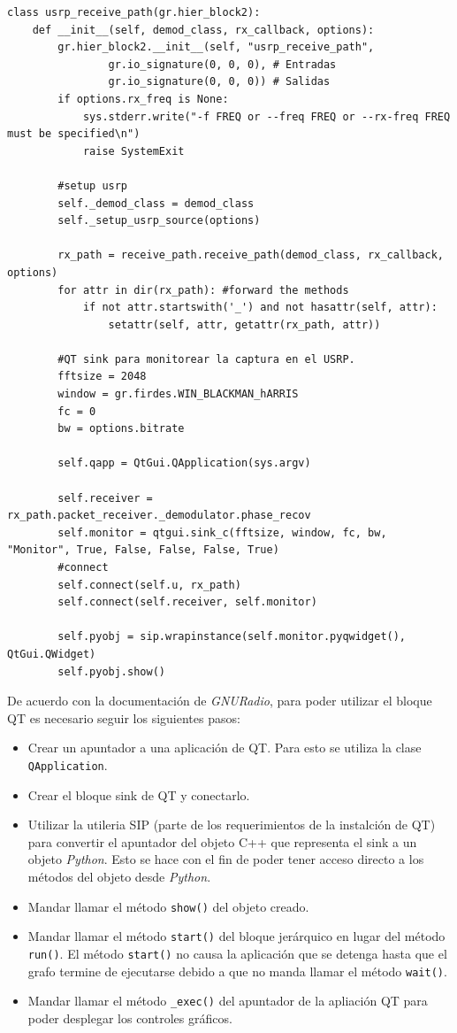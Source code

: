 \begin{lstlisting}[float, label=ex:qtsink, caption={Modificaci\'on del programa \emph{benchmark} para
desplegar el bloque gr\'afico de QT.}, breaklines=true] 
class usrp_receive_path(gr.hier_block2):
    def __init__(self, demod_class, rx_callback, options):
        gr.hier_block2.__init__(self, "usrp_receive_path",
                gr.io_signature(0, 0, 0), # Entradas
                gr.io_signature(0, 0, 0)) # Salidas
        if options.rx_freq is None:
            sys.stderr.write("-f FREQ or --freq FREQ or --rx-freq FREQ must be specified\n")
            raise SystemExit

        #setup usrp
        self._demod_class = demod_class
        self._setup_usrp_source(options)

        rx_path = receive_path.receive_path(demod_class, rx_callback, options)
        for attr in dir(rx_path): #forward the methods
            if not attr.startswith('_') and not hasattr(self, attr):
                setattr(self, attr, getattr(rx_path, attr))

        #QT sink para monitorear la captura en el USRP.
        fftsize = 2048
        window = gr.firdes.WIN_BLACKMAN_hARRIS
        fc = 0
        bw = options.bitrate

        self.qapp = QtGui.QApplication(sys.argv)

        self.receiver = rx_path.packet_receiver._demodulator.phase_recov
        self.monitor = qtgui.sink_c(fftsize, window, fc, bw, "Monitor", True, False, False, False, True)
        #connect
        self.connect(self.u, rx_path)
        self.connect(self.receiver, self.monitor)

        self.pyobj = sip.wrapinstance(self.monitor.pyqwidget(), QtGui.QWidget)
        self.pyobj.show()
\end{lstlisting}

De acuerdo con la documentaci\'on de \emph{GNURadio}, para poder utilizar el bloque QT es necesario seguir
los siguientes pasos:
\begin{itemize}
  \item Crear un apuntador a una aplicaci\'on de QT. Para esto se utiliza la clase
  \verb|QApplication|.
  \item Crear el bloque sink de QT y conectarlo.
  \item Utilizar la utileria SIP (parte de los requerimientos de la instalci\'on de QT) para
  convertir el apuntador del objeto C++ que representa el sink a un objeto \emph{Python}. Esto se hace con
  el fin de poder tener acceso directo a los m\'etodos del objeto desde \emph{Python}.
  \item Mandar llamar el m\'etodo \verb|show()| del objeto creado.
  \item Mandar llamar el m\'etodo \verb|start()| del bloque jer\'arquico en lugar del m\'etodo
  \verb|run()|. El m\'etodo \verb|start()| no causa la aplicaci\'on que se detenga hasta que el grafo
  termine de ejecutarse debido a que no manda llamar el m\'etodo \verb|wait()|.
  \item Mandar llamar el m\'etodo \verb|_exec()| del apuntador de la apliaci\'on QT para poder desplegar
  los controles gr\'aficos. 
\end{itemize}

